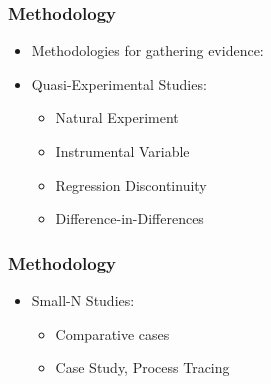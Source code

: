 \documentclass[xcolor=x11names,compress]{beamer}\usepackage[]{graphicx}\usepackage[]{color}
\renewcommand{\(}{\begin{columns}}
\renewcommand{\)}{\end{columns}}
\newcommand{\<}[1]{\begin{column}{#1}}
\renewcommand{\>}{\end{column}}
\begin{document}
\begin{frame}
\frametitle{Methodology}
\begin{itemize}
\item Methodologies for gathering evidence:
\pause
\item Quasi-Experimental Studies:
\pause
\begin{itemize}
\item Natural Experiment
\pause
\item Instrumental Variable
\pause
\item Regression Discontinuity
\pause
\item Difference-in-Differences
\end{itemize}
\end{itemize}
\end{frame}


\begin{frame}
\frametitle{Methodology}
\begin{itemize}
\item Small-N Studies:
\pause
\begin{itemize}
\item Comparative cases
\pause
\item Case Study, Process Tracing
\end{itemize}
\end{itemize}
\end{frame}






\end{document}
